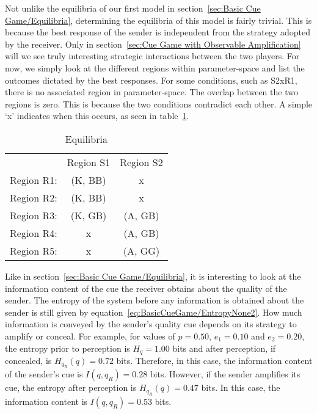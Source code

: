 \documentclass[a4paper,12pt]{article}
\numberwithin{equation}{section}
\begin{document}
Not unlike the equilibria of our first model in section~\ref{sec:Basic Cue Game/Equilibria}, determining the equilibria of this model is fairly trivial. This is because the best response of the sender is independent from the strategy adopted by the receiver. Only in section~\ref{sec:Cue Game with Observable Amplification} will we see truly interesting strategic interactions between the two players. For now, we simply look at the different regions within parameter-space and list the outcomes dictated by the best responses. For some conditions, such as S2xR1, there is no associated region in parameter-space. The overlap between the two regions is zero. This is because the two conditions contradict each other. A simple `x' indicates when this occurs, as seen in table~\ref{tab:CueGamewithUnconditionalAmplification/Equilibria}.

\begin{table}[h]
\begin{center}
\begin{tabular}{lcc}
 & Region S1 & Region S2\\
Region R1: & (K, BB) & x\\
Region R2: & (K, BB) & x\\
Region R3: & (K, GB) & (A, GB)\\
Region R4: & x & (A, GB)\\
Region R5: & x & (A, GG)
\end{tabular}
\end{center}
\caption{Equilibria}
\label{tab:CueGamewithUnconditionalAmplification/Equilibria}
\end{table}

Like in section~\ref{sec:Basic Cue Game/Equilibria}, it is interesting to look at the information content of the cue the receiver obtains about the quality of the sender. The entropy of the system before any information is obtained about the sender is still given by equation~\ref{eq:BasicCueGame/EntropyNone2}. How much information is conveyed by the sender's quality cue depends on its strategy to amplify or conceal. For example, for values of $p = 0.50$, $e_{1} = 0.10$ and $e_{2} = 0.20$, the entropy prior to perception is $H_{q} = 1.00$ bits and after perception, if concealed, is $H_{q_{R}}(q) = 0.72$ bits. Therefore, in this case, the information content of the sender's cue is $I(q, q_{R}) = 0.28$ bits. However, if the sender amplifies its cue, the entropy after perception is $H_{q_{R}}(q) = 0.47$ bits. In this case, the information content is $I(q, q_{R}) = 0.53$ bits.
\end{document}

